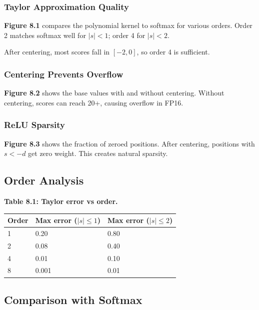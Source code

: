 \subsubsection{Taylor Approximation Quality}

\textbf{Figure 8.1} compares the polynomial kernel to softmax for various orders. 
Order 2 matches softmax well for $|s| < 1$; order 4 for $|s| < 2$.

After centering, most scores fall in $[-2, 0]$, so order 4 is sufficient.

\subsubsection{Centering Prevents Overflow}

\textbf{Figure 8.2} shows the base values with and without centering. Without 
centering, scores can reach 20+, causing overflow in FP16.

\subsubsection{ReLU Sparsity}

\textbf{Figure 8.3} shows the fraction of zeroed positions. After centering, 
positions with $s < -d$ get zero weight. This creates natural sparsity.

\subsection{Order Analysis}

\textbf{Table 8.1: Taylor error vs order.}

\begin{table}[H]
\centering
\small
\begin{tabular}{lll}
\toprule
\textbf{Order} & \textbf{Max error ($|s| \leq 1$)} & \textbf{Max error ($|s| \leq 2$)} \\
\midrule
1 & 0.20 & 0.80 \\
2 & 0.08 & 0.40 \\
4 & 0.01 & 0.10 \\
8 & 0.001 & 0.01 \\
\bottomrule
\end{tabular}
\end{table}

\subsection{Comparison with Softmax}

